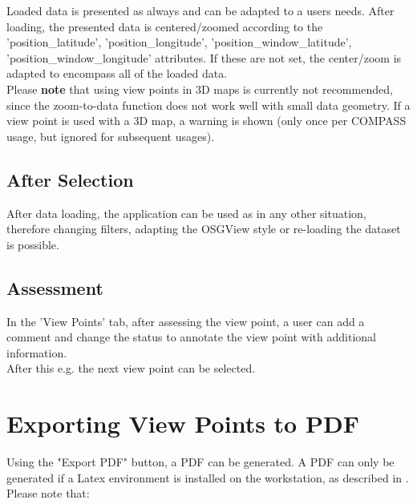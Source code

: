 Loaded data is presented as always and can be adapted to a users needs. After loading, the presented data is centered/zoomed according to the 'position\_latitude', 'position\_longitude', 'position\_window\_latitude', 'position\_window\_longitude' attributes. If these are not set, the center/zoom is adapted to encompass all of the loaded data. \\

Please \textbf{note} that using view points in 3D maps is currently not recommended, since the zoom-to-data function does not work well with small data geometry. If a view point is used with a 3D map, a warning is shown (only once per COMPASS usage, but ignored for subsequent usages).


\subsection{After Selection}

After data loading, the application can be used as in any other situation, therefore changing filters, adapting the OSGView style or re-loading the dataset is possible.

\subsection{Assessment}

In the 'View Points' tab, after assessing the view point, a user can add a comment and change the status to annotate the view point with additional information. \\

After this e.g. the next view point can be selected.

\section{Exporting View Points to PDF}
\label{sec:view_points_export_pdf} 

Using the "Export PDF" button, a PDF can be generated. A PDF can only be generated if a Latex environment is installed on the workstation, as described in . \\

Please note that:

